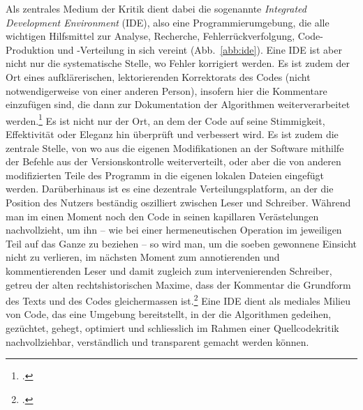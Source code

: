 \documentclass[a4paper,10pt]{article}
\begin{document}
Als zentrales Medium der Kritik dient dabei die sogenannte \emph{Integrated Development Environment} (IDE), also eine Programmierumgebung, die alle wichtigen Hilfsmittel zur Analyse, Recherche, Fehlerrückverfolgung, Code-Produktion und -Verteilung in sich vereint (Abb.~\ref{abb:ide}). Eine IDE ist aber nicht nur die systematische Stelle, wo Fehler korrigiert werden. Es ist zudem der Ort eines aufklärerischen, lektorierenden Korrektorats des Codes (nicht notwendigerweise von einer anderen Person), insofern hier die Kommentare einzufügen sind, die dann zur Dokumentation der Algorithmen weiterverarbeitet werden.\footcite[Dieses Prinzip, wie es etwa mit Javadoc umgesetzt worden ist, geht auf das Paradigma des \emph{Literate Programming} von][zurück.]{knuth:1984} Es ist nicht nur der Ort, an dem der Code auf seine Stimmigkeit, Effektivität oder Eleganz hin überprüft und verbessert wird. Es ist zudem die zentrale Stelle, von wo aus die eigenen Modifikationen an der Software mithilfe der Befehle aus der Versionskontrolle weiterverteilt, oder aber die von anderen modifizierten Teile des Programm in die eigenen lokalen Dateien eingefügt werden. Darüberhinaus ist es eine dezentrale Verteilungsplatform, an der die Position des Nutzers beständig oszilliert zwischen Leser und Schreiber. Während man im einen Moment noch den Code in seinen kapillaren Verästelungen nachvollzieht, um ihn – wie bei einer hermeneutischen Operation im jeweiligen Teil auf das Ganze zu beziehen – so wird man, um die soeben gewonnene Einsicht nicht zu verlieren, im nächsten Moment zum annotierenden und kommentierenden Leser und damit zugleich zum intervenierenden Schreiber, getreu der alten rechtshistorischen Maxime, dass der Kommentar die Grundform des Texts und des Codes gleichermassen ist.\footcite[Vgl.][]{krajewski+vismann:2009} Eine IDE dient als mediales Milieu von Code, das eine Umgebung bereitstellt, in der die Algorithmen gedeihen, gezüchtet, gehegt, optimiert und schliesslich im Rahmen einer Quellcodekritik nachvollziehbar, verständlich und transparent gemacht werden können.
\end{document}
